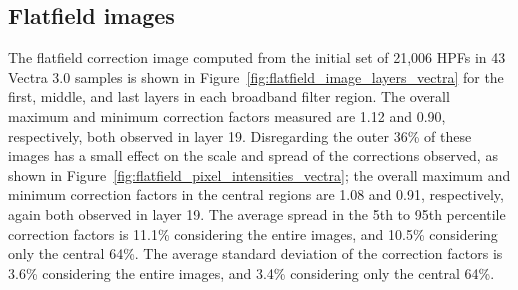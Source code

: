 \documentclass[letterpaper,11pt]{article}
\newcommand{\reffig}[1]{Figure~\ref{#1}}
\begin{document}
\subsection{Flatfield images}
\label{ssec:flatfield_images}

The flatfield correction image computed from the initial set of 21,006 HPFs in 43 Vectra 3.0 samples is shown in \reffig{fig:flatfield_image_layers_vectra} for the first, middle, and last layers in each broadband filter region. The overall maximum and minimum correction factors measured are 1.12 and 0.90, respectively, both observed in layer 19. Disregarding the outer 36\% of these images has a small effect on the scale and spread of the corrections observed, as shown in \reffig{fig:flatfield_pixel_intensities_vectra}; the overall maximum and minimum correction factors in the central regions are 1.08 and 0.91, respectively, again both observed in layer 19. The average spread in the 5th to 95th percentile correction factors is 11.1\% considering the entire images, and 10.5\% considering only the central 64\%. The average standard deviation of the correction factors is 3.6\% considering the entire images, and 3.4\% considering only the central 64\%. 
\end{document}
